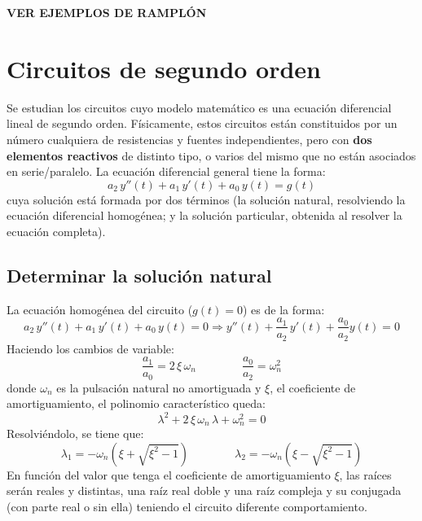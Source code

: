 \documentclass[11pt]{book} %
\begin{document}
	\begin{example}\label{ex.primer_orden}
	    \textbf{VER EJEMPLOS DE RAMPLÓN}
	\end{example}
	
	\section{Circuitos de segundo orden}
	Se estudian los circuitos cuyo modelo matemático es una ecuación diferencial lineal de segundo orden. Físicamente, estos circuitos están constituidos por un número cualquiera de resistencias y fuentes independientes, pero con \textbf{dos elementos reactivos} de distinto tipo, o varios del mismo que no están asociados en serie/paralelo. La ecuación diferencial general tiene la forma: 
	\begin{equation*}
	    a_2\,y''(t)+a_1\,y'(t)+a_0\,y(t)=g(t)
	\end{equation*}
	cuya solución está formada por dos términos (la solución natural, resolviendo la ecuación diferencial homogénea; y la solución particular, obtenida al resolver la ecuación completa).
	
	\subsection{Determinar la solución natural}
	La ecuación homogénea del circuito ($g(t)=0$) es de la forma:
	\begin{equation*}
	    a_2\,y''(t)+a_1\,y'(t)+a_0\,y(t)=0\Rightarrow y''(t)+\dfrac{a_1}{a_2}\,y'(t)+\dfrac{a_0}{a_2}y(t)=0
	\end{equation*}
	Haciendo los cambios de variable:
	\begin{equation}\label{eq.xi-omega_n}
	    \boxed{\dfrac{a_1}{a_0}=2\,\xi\,\omega_n}\qquad \qquad \boxed{\dfrac{a_0}{a_2}=\omega_n^2}
	\end{equation}
	donde $\omega_n$ es la pulsación natural no amortiguada y $\xi$, el coeficiente de amortiguamiento, el polinomio característico queda: 
	\begin{equation*}
	    \lambda^2+2\,\xi\,\omega_n\,\lambda + \omega_n^2=0
	\end{equation*}
	Resolviéndolo, se tiene que: 
	\begin{equation*}
	    \lambda_1=-\omega_n\left(\xi+\sqrt{\xi^2-1} \right)\qquad\qquad \lambda_2=-\omega_n\left(\xi-\sqrt{\xi^2-1} \right)
	\end{equation*}
	En función del valor que tenga el coeficiente de amortiguamiento $\xi$, las raíces serán reales y distintas, una raíz real doble y una raíz compleja y su conjugada (con parte real o sin ella) teniendo el circuito diferente comportamiento. 
	
\end{document}
